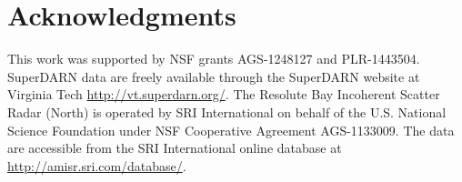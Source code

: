 \section*{Acknowledgments}
This work was supported by NSF grants AGS-1248127 and PLR-1443504.  SuperDARN data are freely available through the SuperDARN website at Virginia Tech \url{http://vt.superdarn.org/}.  The Resolute Bay Incoherent Scatter Radar (North) is operated by SRI International on behalf of the U.S. National Science Foundation under NSF Cooperative Agreement AGS-1133009.  The data are accessible from the SRI International online database at \url{http://amisr.sri.com/database/}.







